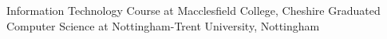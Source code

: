 %
%
%


\begin{scholarship}
                    {Information Technology Course at Macclesfield College, Cheshire}
					{Graduated Computer Science at Nottingham-Trent University, Nottingham}
\end{scholarship}